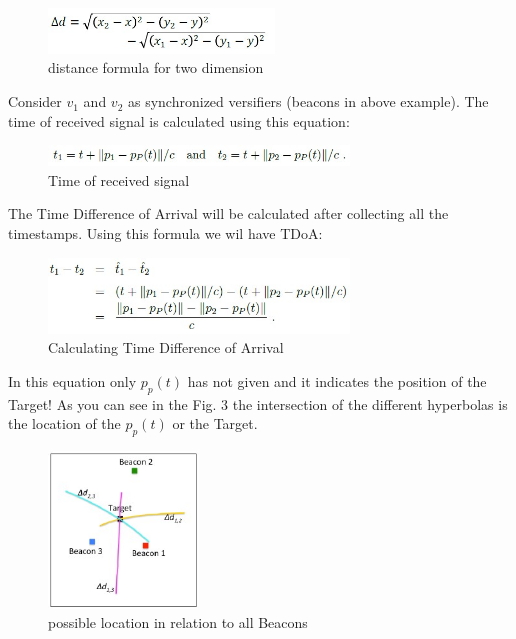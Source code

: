 \begin{figure}[htp]
    \centering
    \includegraphics[width=6cm]{5.jpg}
    \caption{distance formula for two dimension \cite{schaefer1}}
    \label{fig:formula}
\end{figure}




Consider $v_1$ and $v_2$ as synchronized versifiers (beacons in above example). The time of received signal is calculated using this equation:

\begin{figure}[htp]
    \centering
    \includegraphics[width=8cm]{6.jpg}
    \caption{Time of received signal \cite{schaefer18}}
    \label{fig:formula}
\end{figure}


The Time Difference of Arrival will be calculated after collecting all the timestamps. Using this formula we wil have TDoA:


\begin{figure}[htp]
    \centering
    \includegraphics[width=8cm]{7.jpg}
    \caption{Calculating Time Difference of Arrival \cite{schaefer18}}
    \label{fig:formula}
\end{figure}

In this equation only $p_p(t)$ has not given and it indicates the position of the Target! As you can see in the Fig. 3 the intersection of the different hyperbolas is the location of the $p_p(t)$ or the Target. \cite{brian17}

\begin{figure}[htp]
    \centering
    \includegraphics[width=4cm]{8.jpg}
    \caption{possible location in relation to all Beacons \cite{brian17}}
    \label{fig:fig}
\end{figure}

